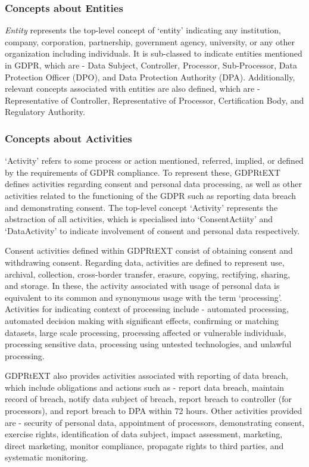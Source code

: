 \subsubsection{Concepts about Entities}
\textit{Entity} represents the top-level concept of `entity' indicating any institution, company, corporation, partnership, government agency, university, or any other organization including individuals. 
It is sub-classed to indicate entities mentioned in GDPR, which are - Data Subject, Controller, Processor, Sub-Processor, Data Protection Officer (DPO), and Data Protection Authority (DPA). Additionally, relevant concepts associated with entities are also defined, which are -  Representative of Controller, Representative of Processor, Certification Body, and Regulatory Authority.

\subsubsection{Concepts about Activities}
`Activity' refers to some process or action mentioned, referred, implied, or defined by the requirements of GDPR compliance. To represent these, GDPRtEXT defines activities regarding consent and personal data processing, as well as other activities related to the functioning of the GDPR such as reporting data breach and demonstrating consent. The top-level concept `Activity' represents the abstraction of all activities, which is specialised into `ConsentActiity' and `DataActivity' to indicate involvement of consent and personal data respectively.

Consent activities defined within GDPRtEXT consist of obtaining consent and withdrawing consent. Regarding data, activities are defined to represent use, archival, collection, cross-border transfer, erasure, copying, rectifying, sharing, and storage. In these, the activity associated with usage of personal data is equivalent to its common and synonymous usage with the term `processing'. Activities for indicating context of processing include - automated processing,  automated decision making with significant effects, confirming or matching datasets, large scale processing, processing affected or vulnerable individuals, processing sensitive data, processing using untested technologies, and unlawful processing.

GDPRtEXT also provides activities associated with reporting of data breach, which include obligations and actions such as - report data breach, maintain record of breach, notify data subject of breach, report breach to controller (for processors), and report breach to DPA within 72 hours. Other activities provided are - security of personal data, appointment of processors, demonstrating consent, exercise rights, identification of data subject, impact assessment, marketing, direct marketing, monitor compliance, propagate rights to third parties, and systematic monitoring.

